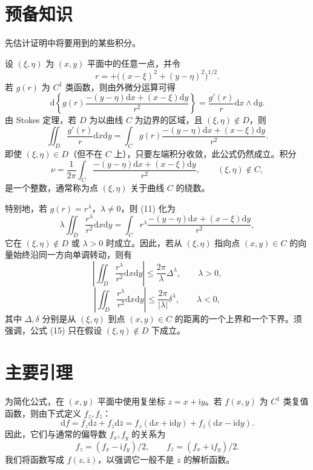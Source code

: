 \documentclass[UTF8,a4paper,11pt,fontset=fandol]{ctexart}
\newcommand{\dd}{\mathrm d}
\newcommand{\ii}{\mathrm i}
\begin{document}
\section{预备知识}
先估计证明中将要用到的某些积分。

设 $(\xi,\eta)$ 为 $(x,y)$ 平面中的任意一点，并令
\begin{equation}r=+\bigl((x-\xi)^2+(y-\eta)^2\bigr)^{1/2}.\tag{10}\end{equation}
若 $g(r)$ 为 $C^1$ 类函数，则由外微分运算可得
\[\dd\left\{g(r)\frac{-(y-\eta)\dd x+(x-\xi)\dd y}{r^2}\right\}=\frac{g'(r)}r\dd x\wedge\dd y.\]
由 Stokes 定理，若 $D$ 为以曲线 $C$ 为边界的区域，且 $(\xi,\eta)\notin D$，则
\begin{equation}\iint_D\frac{g'(r)}r\dd x\dd y=\int_Cg(r)\frac{-(y-\eta)\dd x+(x-\xi)\dd y}{r^2}.\tag{11}\end{equation}
即使 $(\xi,\eta)\in D$（但不在 $C$ 上），只要左端积分收敛，此公式仍然成立。积分
\begin{equation}\nu=\frac1{2\pi}\int_C\frac{-(y-\eta)\dd x+(x-\xi)\dd y}{r^2},\qquad(\xi,\eta)\notin C,\tag{12}\end{equation}
是一个整数，通常称为点 $(\xi,\eta)$ 关于曲线 $C$ 的绕数。

特别地，若 $g(r)=r^\lambda$，$\lambda\ne0$，则 (11) 化为
\begin{equation}\lambda\iint_D\frac{r^\lambda}{r^2}\dd x\dd y=\int_Cr^\lambda\frac{-(y-\eta)\dd x+(x-\xi)\dd y}{r^2},\tag{13}\end{equation}
它在 $(\xi,\eta)\notin D$ 或 $\lambda>0$ 时成立。因此，若从 $(\xi,\eta)$ 指向点 $(x,y)\in C$ 的向量始终沿同一方向单调转动，则有
\begin{equation}\left|\iint_D\frac{r^\lambda}{r^2}\dd x\dd y\right|\le\frac{2\pi}{\lambda}\Delta^\lambda,\qquad\lambda>0,\tag{14}\end{equation}
\begin{equation}\left|\iint_D\frac{r^\lambda}{r^2}\dd x\dd y\right|\le\frac{2\pi}{|\lambda|}\delta^\lambda,\qquad\lambda<0,\tag{15}\end{equation}
其中 $\Delta,\delta$ 分别是从 $(\xi,\eta)$ 到点 $(x,y)\in C$ 的距离的一个上界和一个下界。须强调，公式 (15) 只在假设 $(\xi,\eta)\notin D$ 下成立。

\section{主要引理}
为简化公式，在 $(x,y)$ 平面中使用复坐标 $z=x+\ii y$。若 $f(x,y)$ 为 $C^1$ 类复值函数，则由下式定义 $f_z,f_{\bar z}$：
\begin{equation}\dd f=f_z\dd z+f_{\bar z}\dd\bar z=f_z(\dd x+\ii\dd y)+f_{\bar z}(\dd x-\ii\dd y).\tag{16}\end{equation}
因此，它们与通常的偏导数 $f_x,f_y$ 的关系为
\begin{equation}f_z=(f_x-\ii f_y)/2,\qquad f_{\bar z}=(f_x+\ii f_y)/2.\tag{17}\end{equation}
我们将函数写成 $f(z,\bar z)$，以强调它一般不是 $z$ 的解析函数。
\end{document}
